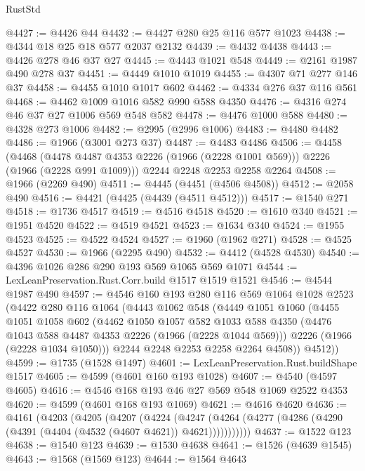 \begin{lexlean}{RustStd}
\begin{coremodule}
@4427 := @4426 @44
@4432 := @4427 @280 @25 @116 @577 @1023
@4438 := @4344 @18 @25 @18 @577 @2037 @2132
@4439 := @4432 @4438
@4443 := @4426 @278 @46 @37 @27
@4445 := @4443 @1021 @548
@4449 := @2161 @1987 @490 @278 @37
@4451 := @4449 @1010 @1019
@4455 := @4307 @71 @277 @146 @37
@4458 := @4455 @1010 @1017 @602
@4462 := @4334 @276 @37 @116 @561
@4468 := @4462 @1009 @1016 @582 @990 @588 @4350
@4476 := @4316 @274 @46 @37 @27 @1006 @569 @548 @582
@4478 := @4476 @1000 @588
@4480 := @4328 @273 @1006
@4482 := @2995 (@2996 @1006)
@4483 := @4480 @4482
@4486 := @1966 (@3001 @273 @37)
@4487 := @4483 @4486
@4506 := @4458
    (@4468 (@4478 @4487 @4353 @2226 (@1966 (@2228 @1001 @569))) @2226 (@1966 (@2228 @991 @1009)))
    @2244
    @2248
    @2253
    @2258
    @2264
@4508 := @1966 (@2269 @490)
@4511 := @4445 (@4451 (@4506 @4508))
@4512 := @2058 @490
@4516 := @4421 (@4425 (@4439 (@4511 @4512)))
@4517 := @1540 @271
@4518 := @1736 @4517
@4519 := @4516 @4518
@4520 := @1610 @340
@4521 := @1951 @4520
@4522 := @4519 @4521
@4523 := @1634 @340
@4524 := @1955 @4523
@4525 := @4522 @4524
@4527 := @1960 (@1962 @271)
@4528 := @4525 @4527
@4530 := @1966 (@2295 @490)
@4532 := @4412 (@4528 @4530)
@4540 := @4396 @1026 @286 @290 @193 @569 @1065 @569 @1071
@4544 := LexLeanPreservation.Rust.Corr.build @1517 @1519 @1521
@4546 := @4544 @1987 @490
@4597 := @4546
    @160
    @193
    @280
    @116
    @569
    @1064
    @1028
    @2523
    (@4422
      @280
      @116
      @1064
      (@4443
        @1062
        @548
        (@4449
          @1051
          @1060
          (@4455
            @1051
            @1058
            @602
            (@4462
              @1050
              @1057
              @582
              @1033
              @588
              @4350
              (@4476 @1043 @588 @4487 @4353 @2226 (@1966 (@2228 @1044 @569)))
              @2226
              (@1966 (@2228 @1034 @1050)))
            @2244
            @2248
            @2253
            @2258
            @2264
            @4508))
        @4512))
@4599 := @1735 (@1528 @1497)
@4601 := LexLeanPreservation.Rust.buildShape @1517
@4605 := @4599 (@4601 @160 @193 @1028)
@4607 := @4540 (@4597 @4605)
@4616 := @4546 @168 @193 @46 @27 @569 @548 @1069 @2522 @4353
@4620 := @4599 (@4601 @168 @193 @1069)
@4621 := @4616 @4620
@4636 := @4161
    (@4203
      (@4205
        (@4207
          (@4224
            (@4247 (@4264 (@4277 (@4286 (@4290 (@4391 (@4404 (@4532 (@4607 @4621)) @4621)))))))))))
@4637 := @1522 @123
@4638 := @1540 @123
@4639 := @1530 @4638
@4641 := @1526 (@4639 @1545)
@4643 := @1568 (@1569 @123)
@4644 := @1564 @4643

\end{coremodule}
\end{lexlean}
